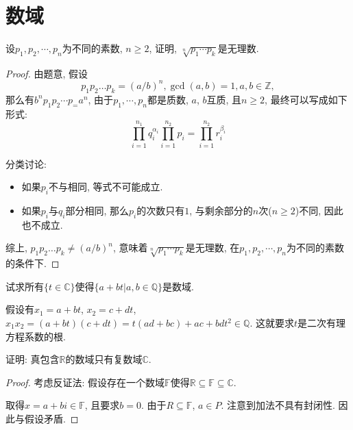 


    \section{数域}
    

    \begin{prob}
        设$p_1, p_2, \cdots, p_n$为不同的素数, $n\geq 2$, 证明, $\sqrt[n]{p_1\cdots p_k}$是无理数. 
    \end{prob}

    \begin{proof}
        由题意, 假设
        $$
        p_1p_2\dots p_k = (a/b)^n, \gcd(a, b) =1, a, b\in \mathbb{Z},
        $$
        那么有$b^np_1p_2\cdots p_=a^n$, 由于$p_1,\cdots, p_n$都是质数, $a$, $b$互质, 且$n\geq 2$, 最终可以写成如下形式:
        $$
        \prod_{i=1}^{n_1} q_i^{\alpha_i} \prod_{i=1}^{n_2} p_i = \prod_{i=1}^{n_2} r_i^{\beta_i}
        $$

        分类讨论: 

        \begin{itemize}
            \item 如果$p_i$不与相同, 等式不可能成立.  
            \item 如果$p_i$与$q_i$部分相同, 那么$p_i$的次数只有$1$, 与剩余部分的$n$次($n\geq 2$)不同, 因此也不成立.  
        \end{itemize}

        综上, $p_1p_2\dots p_k \neq (a/b)^n$, 意味着$\sqrt[n]{p_1\cdots p_k}$是无理数, 在$p_1, p_2, \cdots, p_n$为不同的素数的条件下. 
    \end{proof}

    \begin{prob}
        试求所有$\{t\in \mathbb{C}\}$使得$\{a+bt|a,b\in \mathbb{Q}\}$是数域.
    \end{prob}

    \begin{sol}
        假设有$x_1=a+bt$, $x_2=c+dt$, $x_1x_2=(a+bt)(c+dt)=t (a d+b c)+a c+b d t^2 \in \mathbb{Q}$. 这就要求$t$是二次有理方程系数的根.  
    \end{sol}

    \begin{prob}
        证明: 真包含$\mathbb{R}$的数域只有复数域$\mathbb{C}$.
    \end{prob}

    \begin{proof}
        考虑反证法: 假设存在一个数域$\mathbb{F}$使得$\mathbb{R}\subseteq \mathbb{F} \subseteq \mathbb{C}$. 

        取得$x = a+bi \in \mathbb{F}$, 且要求$b=0$. 由于$R\subseteq \mathbb{F}$, $a\in P$. 注意到加法不具有封闭性. 因此与假设矛盾.   
    \end{proof}

